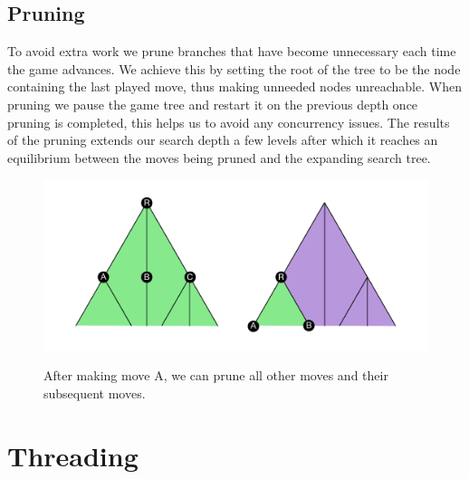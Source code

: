 \documentclass[a4paper, 12pt]{article}
\begin{document}
\subsection{Pruning}
To avoid extra work we prune branches that have become unnecessary each time the game advances. We achieve this by setting the root of the tree to be the node containing the last played move, thus making unneeded nodes unreachable. When pruning we pause the game tree and restart it on the previous depth once pruning is completed, this helps us to avoid any concurrency issues. The results of the pruning extends our search depth a few levels after which it reaches an equilibrium between the moves being pruned and the expanding search tree.
\begin{figure}[h!]
  \centering
  	\includegraphics[width = 15cm]{TreePruning}\\
  \caption{After making move A, we can prune all other moves and their subsequent moves.}
\end{figure}
\section{Threading}
\end{document}
